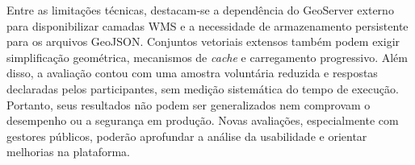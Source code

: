 Entre as limitações técnicas, destacam-se a dependência do GeoServer externo para disponibilizar camadas WMS e a necessidade de armazenamento persistente para os arquivos GeoJSON. Conjuntos vetoriais extensos também podem exigir simplificação geométrica, mecanismos de \textit{cache} e carregamento progressivo. Além disso, a avaliação contou com uma amostra voluntária reduzida e respostas declaradas pelos participantes, sem medição sistemática do tempo de execução. Portanto, seus resultados não podem ser generalizados nem comprovam o desempenho ou a segurança em produção. Novas avaliações, especialmente com gestores públicos, poderão aprofundar a análise da usabilidade e orientar melhorias na plataforma.
